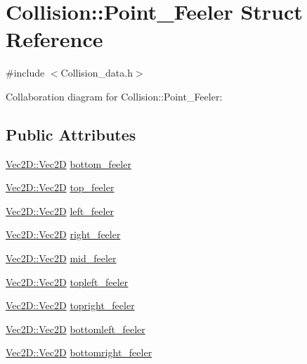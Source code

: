 \hypertarget{struct_collision_1_1_point___feeler}{}\section{Collision\+:\+:Point\+\_\+\+Feeler Struct Reference}
\label{struct_collision_1_1_point___feeler}


{\ttfamily \#include $<$Collision\+\_\+data.\+h$>$}



Collaboration diagram for Collision\+:\+:Point\+\_\+\+Feeler\+:
\subsection*{Public Attributes}
\begin{DoxyCompactItemize}
\item 
\mbox{\hyperlink{struct_vec2_d_1_1_vec2_d}{Vec2\+D\+::\+Vec2D}} \mbox{\hyperlink{struct_collision_1_1_point___feeler_afd306851e1eaaf1ff32fda0d098fb706}{bottom\+\_\+feeler}}
\item 
\mbox{\hyperlink{struct_vec2_d_1_1_vec2_d}{Vec2\+D\+::\+Vec2D}} \mbox{\hyperlink{struct_collision_1_1_point___feeler_ad3cac3a69ea8042cefe28cef2df67ff5}{top\+\_\+feeler}}
\item 
\mbox{\hyperlink{struct_vec2_d_1_1_vec2_d}{Vec2\+D\+::\+Vec2D}} \mbox{\hyperlink{struct_collision_1_1_point___feeler_a855156b67a043fa3689bfd81e1063026}{left\+\_\+feeler}}
\item 
\mbox{\hyperlink{struct_vec2_d_1_1_vec2_d}{Vec2\+D\+::\+Vec2D}} \mbox{\hyperlink{struct_collision_1_1_point___feeler_a523884c48948b4ccebe26b228f02ec79}{right\+\_\+feeler}}
\item 
\mbox{\hyperlink{struct_vec2_d_1_1_vec2_d}{Vec2\+D\+::\+Vec2D}} \mbox{\hyperlink{struct_collision_1_1_point___feeler_a40bc70753a4e531c5aaff0aa93368bf4}{mid\+\_\+feeler}}
\item 
\mbox{\hyperlink{struct_vec2_d_1_1_vec2_d}{Vec2\+D\+::\+Vec2D}} \mbox{\hyperlink{struct_collision_1_1_point___feeler_ac39468978fdb9bf4f3cdd1c525ae8f57}{topleft\+\_\+feeler}}
\item 
\mbox{\hyperlink{struct_vec2_d_1_1_vec2_d}{Vec2\+D\+::\+Vec2D}} \mbox{\hyperlink{struct_collision_1_1_point___feeler_ab4e5a05c06015553697c1ad85c0d0bf7}{topright\+\_\+feeler}}
\item 
\mbox{\hyperlink{struct_vec2_d_1_1_vec2_d}{Vec2\+D\+::\+Vec2D}} \mbox{\hyperlink{struct_collision_1_1_point___feeler_a31e17034f67e685b3c16ddede5d3ddd6}{bottomleft\+\_\+feeler}}
\item 
\mbox{\hyperlink{struct_vec2_d_1_1_vec2_d}{Vec2\+D\+::\+Vec2D}} \mbox{\hyperlink{struct_collision_1_1_point___feeler_a3433c779c3ded5f1b70436f02168a50d}{bottomright\+\_\+feeler}}
\end{DoxyCompactItemize}


